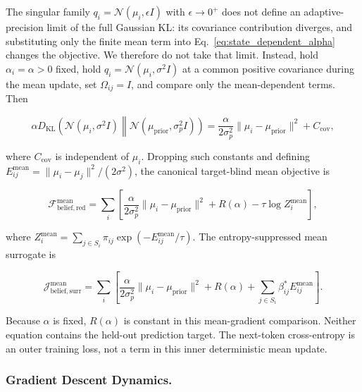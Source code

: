 \documentclass[twoside,11pt]{article}
\begin{document}
The singular family $q_i=\mathcal{N}(\mu_i,\epsilon I)$ with $\epsilon\to0^+$ does not define an adaptive-precision limit of the full Gaussian KL: its covariance contribution diverges, and substituting only the finite mean term into Eq.~\eqref{eq:state_dependent_alpha} changes the objective. We therefore do not take that limit. Instead, hold $\alpha_i=\alpha>0$ fixed, hold $q_i=\mathcal{N}(\mu_i,\sigma^2I)$ at a common positive covariance during the mean update, set $\Omega_{ij}=I$, and compare only the mean-dependent terms. Then

\begin{equation}
\alpha D_{\mathrm{KL}}
\left(
\mathcal{N}(\mu_i,\sigma^2I)
\middle\|
\mathcal{N}(\mu_{\mathrm{prior}},\sigma_p^2I)
\right)
=\frac{\alpha}{2\sigma_p^2}
\|\mu_i-\mu_{\mathrm{prior}}\|^2+C_{\mathrm{cov}},
\label{eq:alpha_i_deterministic}
\end{equation}

where $C_{\mathrm{cov}}$ is independent of $\mu_i$. Dropping such constants and defining $E_{ij}^{\mathrm{mean}}=\|\mu_i-\mu_j\|^2/(2\sigma^2)$, the canonical target-blind mean objective is

\begin{equation}
\mathcal{F}_{\mathrm{belief,red}}^{\mathrm{mean}}
=\sum_i\left[
\frac{\alpha}{2\sigma_p^2}\|\mu_i-\mu_{\mathrm{prior}}\|^2
+R(\alpha)-\tau\log Z_i^{\mathrm{mean}}
\right],
\label{eq:deterministic_free_energy_adaptive}
\end{equation}

where $Z_i^{\mathrm{mean}}=\sum_{j\in S_i}\pi_{ij}\exp(-E_{ij}^{\mathrm{mean}}/\tau)$. The entropy-suppressed mean surrogate is

\begin{equation}
\mathcal{J}_{\mathrm{belief,surr}}^{\mathrm{mean}}
=\sum_i\left[
\frac{\alpha}{2\sigma_p^2}\|\mu_i-\mu_{\mathrm{prior}}\|^2
+R(\alpha)
+\sum_{j\in S_i}\beta_{ij}^*E_{ij}^{\mathrm{mean}}
\right].
\label{eq:deterministic_free_energy_standard}
\end{equation}

Because $\alpha$ is fixed, $R(\alpha)$ is constant in this mean-gradient comparison. Neither equation contains the held-out prediction target. The next-token cross-entropy is an outer training loss, not a term in this inner deterministic mean update.

\subsubsection{Gradient Descent Dynamics.}
\end{document}

